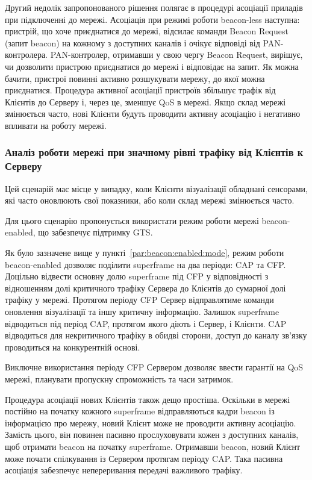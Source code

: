 \documentclass[a4paper,ukrainian,utf8,nocolumnsxix,floatsection,equationsection]{eskdtext}
\renewcommand\paragraph{\subsubsection}
\newcommand{\blm}[0]{beacon-less\xspace}
\newcommand{\bem}[0]{beacon-enabled\xspace}
\begin{document}
Другий недолік запропонованого рішення полягає в процедурі асоціації приладів при підключенні до мережі. Асоціація при режимі роботи \blm наступна: пристрій, що хоче приєднатися до мережі, відсилає команди Beacon Request (запит beacon) на кожному з доступних каналів і очікує відповіді від PAN-контролера. PAN-контролер, отримавши  у свою чергу Beacon Request, вирішує, чи дозволити пристрою приєднатися до мережі і відповідає на запит. Як можна бачити, пристрої повинні активно розшукувати мережу, до якої можна приєднатися. Процедура активної асоціації пристроїв збільшує трафік від Клієнтів до Серверу і, через це, зменшує QoS в мережі. Якщо склад мережі змінюється часто, нові Клієнти будуть проводити активну асоціацію і негативно впливати на роботу мережі.

\paragraph{Аналіз роботи мережі при значному рівні трафіку від Клієнтів к Серверу}
\label{par:high:ntht}

Цей сценарій має місце у випадку, коли Клієнти візуалізації обладнані сенсорами, які часто  оновлюють свої показники, або коли склад мережі змінюється часто.

Для цього сценарію пропонується використати режим роботи мережі \bem, що забезпечує підтримку GTS.

Як було зазначене вище у пункті~\ref{par:beacon:enabled:mode}, режим роботи \bem дозволяє поділити superframe на два періоди: CAP та CFP. Доцільно відвести основну долю superframe під CFP у відповідності з відношенням долі критичного трафіку Сервера до Клієнтів до сумарної долі трафіку у мережі. Протягом періоду CFP Сервер відправлятиме команди оновлення візуалізації та іншу критичну інформацію. Залишок superframe відводиться під період CAP, протягом якого діють і Сервер, і Клієнти. CAP відводиться для некритичного трафіку в обидві сторони, доступ до каналу зв'язку проводиться на конкурентній основі. 

Виключне використання періоду CFP Сервером дозволяє ввести гарантії на QoS мережі, планувати пропускну спроможність та часи затримок. 

Процедура асоціації нових Клієнтів також дещо простіша. Оскільки в мережі постійно на початку кожного superframe відправляються кадри beacon із інформацією про мережу, новий Клієнт може не проводити активну асоціацію. Замість цього, він повинен пасивно прослуховувати кожен з доступних каналів, щоб отримати beacon на початку superframe. Отримавши beacon, новий Клієнт може почати спілкування із Сервером протягам періоду CAP. Така пасивна асоціація забезпечує непереривання передачі важливого трафіку.
\end{document}
